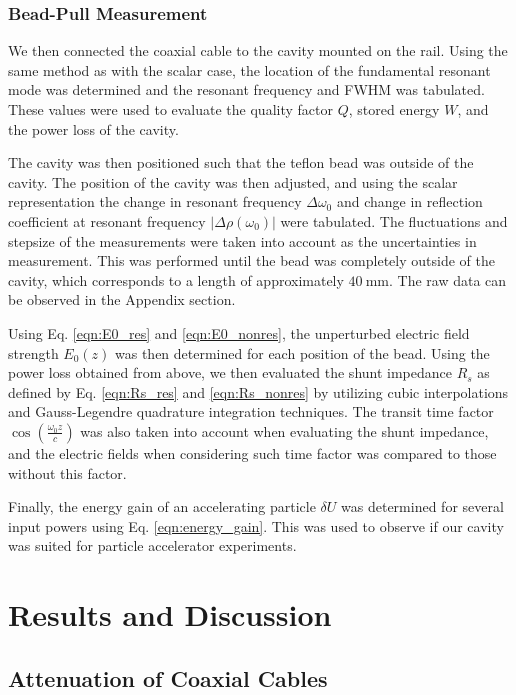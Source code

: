 \documentclass[a4paper]{report}
\numberwithin{equation}{section}
\begin{document}
\subsection{Bead-Pull Measurement}
 

We then connected the coaxial cable to the cavity mounted on the rail. Using the
same method as with the scalar case, the location of the fundamental resonant
mode was determined and the resonant frequency and FWHM was tabulated. These
values were used to evaluate the quality factor $Q$, stored energy $W$, and the
power loss of the cavity. \par 

The cavity was then positioned such that the teflon bead was outside of the
cavity. The position of the cavity was then adjusted, and using the scalar
representation the change in resonant frequency $\Delta\omega_0$ and change in
reflection coefficient at resonant frequency $|\Delta\rho(\omega_0)|$ were
tabulated. The fluctuations and stepsize of the measurements were taken into
account as the uncertainties in measurement. This was performed until the bead
was completely outside of the cavity, which corresponds to a length of
approximately $\SI{40}{\milli\metre}$. The raw data can be observed in the
Appendix section. \par 

Using Eq. \ref{eqn:E0_res} and \ref{eqn:E0_nonres}, the unperturbed electric
field strength $E_0(z)$ was then determined for each position of the bead. Using
the power loss obtained from above, we then evaluated the shunt impedance $R_s$
as defined by Eq. \ref{eqn:Rs_res} and \ref{eqn:Rs_nonres} by
utilizing cubic interpolations and Gauss-Legendre quadrature integration
techniques. The transit time factor $\cos(\frac{\omega_0 z}{c})$ was also taken
into account when evaluating the shunt impedance, and the electric fields when
considering such time factor was compared to those without this factor. \par 

Finally, the energy gain of an accelerating particle $\delta U$ was determined for several
input powers using Eq. \ref{eqn:energy_gain}. This was used to observe if our cavity was suited for particle
accelerator experiments.

\chapter{Results and Discussion}

\section{Attenuation of Coaxial Cables}
\end{document}
